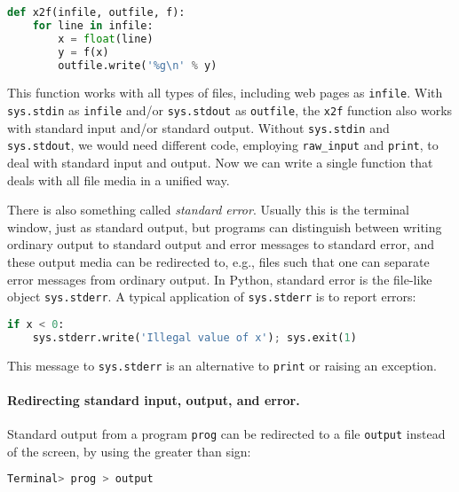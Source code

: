 \documentclass[graybox,sectrefs,envcountresetchap,open=right,final]{svmonodo}
\begin{document}
\begin{lstlisting}[language=Python,style=simple,xleftmargin=2mm]
def x2f(infile, outfile, f):
    for line in infile:
        x = float(line)
        y = f(x)
        outfile.write('%g\n' % y)

\end{lstlisting}

This function works with all types of files, including
web pages as \texttt{infile}.
With \texttt{sys.stdin} as \texttt{infile} and/or \texttt{sys.stdout}
as \texttt{outfile}, the \texttt{x2f} function also works with standard input
and/or standard output. Without \texttt{sys.stdin} and \texttt{sys.stdout},
we would need different code, employing \Verb!raw_input!
and \texttt{print},
to deal with standard input and output. Now we can write a single
function that deals with all file media in a unified way.


There is also something called \emph{standard error}.
Usually this is the terminal window, just as standard output, but
programs can distinguish between writing ordinary output to standard
output and error messages to standard error, and these output media
can be redirected to, e.g., files such that one can separate
error messages from ordinary output.
In Python, standard error is the file-like object \texttt{sys.stderr}.
A typical application of \texttt{sys.stderr} is to report errors:




\begin{lstlisting}[language=Python,style=simple,xleftmargin=2mm]
if x < 0:
    sys.stderr.write('Illegal value of x'); sys.exit(1)

\end{lstlisting}

This message to \texttt{sys.stderr} is an alternative to
\texttt{print} or raising an exception.

\paragraph{Redirecting standard input, output, and error.}
Standard output from a program \texttt{prog}
can be redirected to a file
\texttt{output} instead of the screen, by
using the greater than sign:



\begin{lstlisting}[language=bash,style=simple,xleftmargin=2mm]
Terminal> prog > output

\end{lstlisting}
\end{document}
